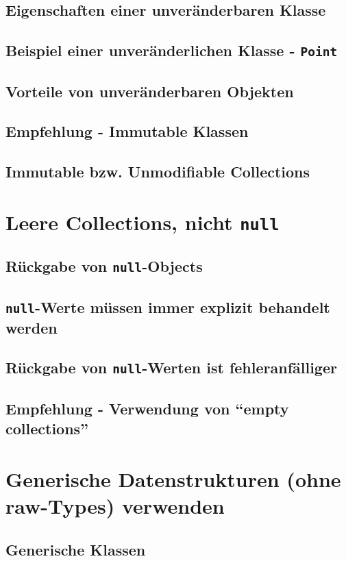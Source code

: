\subsection{Eigenschaften einer unveränderbaren Klasse}
\subsection{Beispiel einer unveränderlichen Klasse - \texttt{Point}}
\subsection{Vorteile von unveränderbaren Objekten}
\subsection{Empfehlung - Immutable Klassen }
\subsection{Immutable bzw. Unmodifiable Collections}

\section{Leere Collections, nicht \texttt{null}}
\subsection{Rückgabe von \texttt{null}-Objects}
\subsection{\texttt{null}-Werte müssen immer explizit behandelt werden}
\subsection{Rückgabe von \texttt{null}-Werten ist fehleranfälliger}
\subsection{Empfehlung - Verwendung von "`empty collections"'}

\section{Generische Datenstrukturen (ohne raw-Types) verwenden}
\subsection{Generische Klassen}
